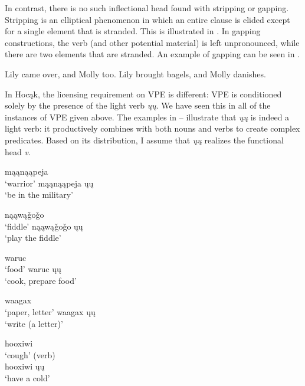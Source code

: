 \documentclass[output=paper]{LSP/langsci}
\begin{document}
In contrast, there is no such inflectional head found with stripping or gapping. Stripping is an elliptical phenomenon in which an entire clause is elided except for a single element that is stranded. This is illustrated in . In gapping constructions, the verb (and other potential material) is left unpronounced, while there are two elements that are stranded. An example of gapping can be seen in .

\ea\label{ex:johnson:13}
\ea\label{ex:johnson:13a}
Lily came over, and Molly too.
\ex\label{ex:johnson:13b}
Lily brought bagels, and Molly danishes.
\z
\z

In Hocąk, the licensing requirement on VPE is different: VPE is conditioned solely by the presence of the light verb \emph{ųų}. We have seen this in all of the instances of VPE given above. The examples in -- illustrate that \emph{ųų} is indeed a light verb: it productively combines with both nouns and verbs to create complex predicates. Based on its distribution, I assume that \emph{ųų} realizes the functional head \emph{v}. \citep[Examples 14--18]{Hartmann2012}

\ea\label{ex:johnson:14}
\begin{multicols}{2}
\ea
mąąnąąpeja\\
`warrior'
\ex
mąąnąąpeja ųų\\
`be in the military'
\z
\end{multicols}
\z

\ea\label{ex:johnson:15}
\begin{multicols}{2}
\ea
nąąwą\v{g}o\v{g}o\\
`fiddle'
\ex
nąąwą\v{g}o\v{g}o ųų\\
`play the fiddle'
\z
\end{multicols}
\z

\ea\label{ex:johnson:16}
\begin{multicols}{2}
\ea
waruc\\
`food'
\ex
waruc ųų\\
`cook, prepare food'
\z
\end{multicols}
\z

\ea\label{ex:johnson:17}
\begin{multicols}{2}
\ea
waagax\\
`paper, letter'
\ex
waagax ųų\\
`write (a letter)'
\z
\end{multicols}
\z

\ea\label{ex:johnson:18}
\begin{multicols}{2}
\ea
hooxiwi\\
`cough' (verb)\\

\ex
hooxiwi ųų\\
`have a cold'
\z
\end{multicols}
\z
\end{document}
